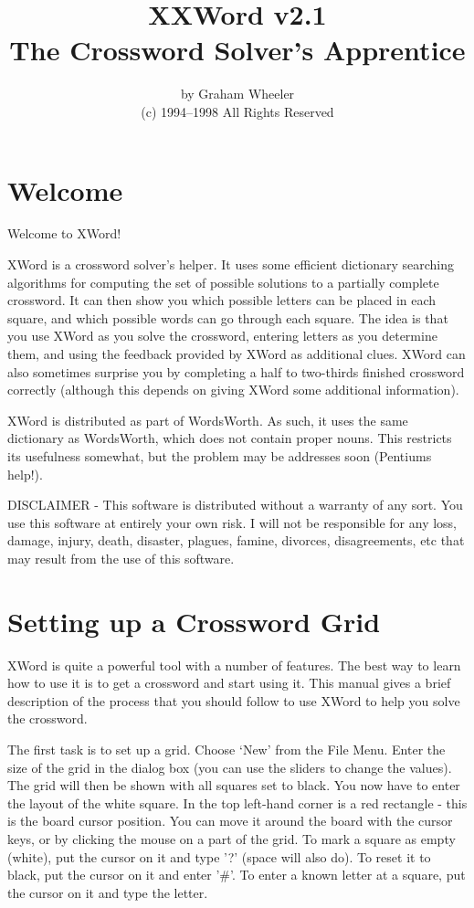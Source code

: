 
\title{XXWord v2.1\\The Crossword Solver's Apprentice}
\author{by Graham Wheeler\\(c) 1994--1998  All Rights Reserved}
\maketitle
\tableofcontents

\section{Welcome}

Welcome to XWord!

XWord is a crossword solver's helper. It uses some efficient
dictionary searching algorithms for computing the set of possible 
solutions to a partially complete crossword. It can then show you 
which possible letters can be placed in each square, and which 
possible words can go through each square. The idea is that you use 
XWord as you solve the crossword, entering letters as you determine
them, and using the feedback provided by XWord as additional clues.
XWord can also sometimes surprise you by completing a half to
two-thirds finished crossword correctly (although this depends on
giving XWord some additional information).

XWord is distributed as part of WordsWorth. As such, it uses the
same dictionary as WordsWorth, which does not contain proper nouns.
This restricts its usefulness somewhat, but the problem may be
addresses soon (Pentiums help!).

DISCLAIMER - This software is distributed without a warranty of 
any sort. You use this software at entirely your own risk. I will
not be responsible for any loss, damage, injury, death, disaster,
plagues, famine, divorces, disagreements, etc that may result from
the use of this software.

\section{Setting up a Crossword Grid}

XWord is quite a powerful tool with a number of features. The
best way to learn how to use it is to get a crossword and start
using it. This manual gives a brief description of the process
that you should follow to use XWord to help you solve the crossword.

The first task is to set up a grid. Choose `New' from the
File Menu. Enter the size of the grid in the dialog box (you can
use the sliders to change the values). The grid will then be shown 
with all squares set to black. You now have to enter the layout of
the white square. In the top left-hand corner is a red rectangle -
this is the board cursor position. You can move it around
the board with the cursor keys, or by clicking the mouse on a
part of the grid. To mark a square as empty (white), put the
cursor on it and type '?' (space will also do). To reset it 
to black, put the cursor on it and enter '#'. To enter a known 
letter at a square, put the cursor on it and type the letter.

